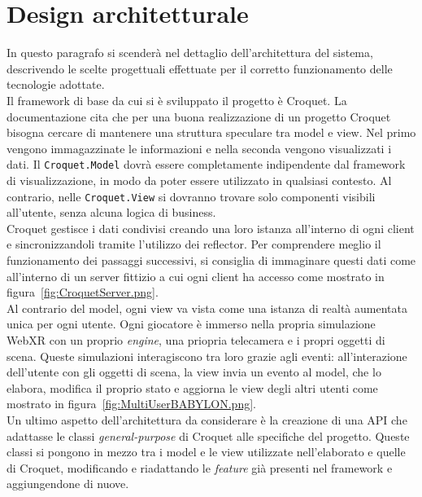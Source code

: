 \section{Design architetturale}\label{sec:design}
In questo paragrafo si scenderà nel dettaglio dell'architettura del sistema, descrivendo le scelte progettuali effettuate per il corretto funzionamento delle tecnologie adottate.\\
\newline
Il framework di base da cui si è sviluppato il progetto è Croquet. La documentazione cita che per una buona realizzazione di un progetto Croquet bisogna cercare di mantenere una 
struttura speculare tra model e view. Nel primo vengono immagazzinate le informazioni e nella seconda vengono visualizzati i dati. Il \texttt{Croquet.Model} dovrà essere 
completamente indipendente dal framework di visualizzazione, in modo da poter essere utilizzato in qualsiasi contesto. Al contrario, nelle
\texttt{Croquet.View} si dovranno trovare solo componenti visibili all'utente, senza alcuna logica di business.\\
Croquet gestisce i dati condivisi creando una loro istanza all'interno di ogni client e sincronizzandoli tramite l'utilizzo dei reflector. Per comprendere meglio il funzionamento
dei passaggi successivi, si consiglia di immaginare questi dati come all'interno di un server fittizio a cui ogni client ha accesso come mostrato in figura~\ref{fig:CroquetServer.png}.\\
Al contrario del model, ogni view va vista come una istanza di realtà aumentata unica per ogni utente. Ogni giocatore è immerso nella propria simulazione WebXR con un proprio 
\textit{engine}, una priopria telecamera e i propri oggetti di scena. Queste simulazioni interagiscono tra loro grazie agli eventi: all'interazione dell'utente con gli oggetti di scena,
la view invia un evento al model, che lo elabora, modifica il proprio stato e aggiorna le view degli altri utenti come mostrato in figura~\ref{fig:MultiUserBABYLON.png}.\\
\newline
Un ultimo aspetto dell'architettura da considerare è la creazione di una API che adattasse le classi \textit{general-purpose} di Croquet alle specifiche del progetto. Queste classi si pongono
in mezzo tra i model e le view utilizzate nell'elaborato e quelle di Croquet, modificando e riadattando le \textit{feature} già presenti nel framework e aggiungendone di nuove. 
